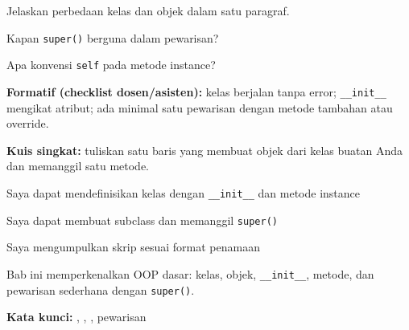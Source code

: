 \documentclass[../main.tex]{subfiles}
\begin{document}
\begin{latihan}
  \item Jelaskan perbedaan kelas dan objek dalam satu paragraf.
  \item Kapan \texttt{super()} berguna dalam pewarisan?
  \item Apa konvensi \texttt{self} pada metode instance?
\end{latihan}

\begin{asesmen}
\textbf{Formatif (checklist dosen/asisten):} kelas berjalan tanpa error; \texttt{\_\_init\_\_} mengikat atribut; ada minimal satu pewarisan dengan metode tambahan atau override.

\textbf{Kuis singkat:} tuliskan satu baris yang membuat objek dari kelas buatan Anda dan memanggil satu metode.
\end{asesmen}

\begin{checklist}
  \item Saya dapat mendefinisikan kelas dengan \texttt{\_\_init\_\_} dan metode instance
  \item Saya dapat membuat subclass dan memanggil \texttt{super()}
  \item Saya mengumpulkan skrip sesuai format penamaan
\end{checklist}

\begin{rangkuman}
Bab ini memperkenalkan OOP dasar: kelas, objek, \texttt{\_\_init\_\_}, metode, dan pewarisan sederhana dengan \texttt{super()}.

\textbf{Kata kunci:} , , , pewarisan
\end{rangkuman}
\end{document}
